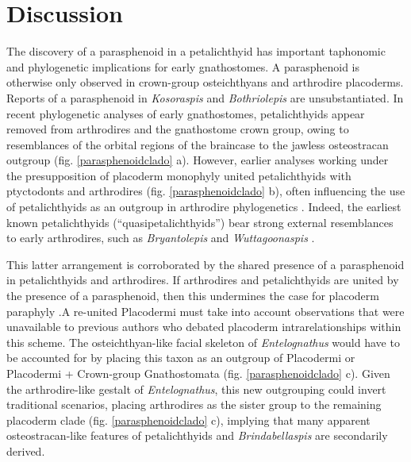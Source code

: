 \documentclass[11pt,letterpaper]{report}
\begin{document}
\section{Discussion}
The discovery of a parasphenoid in a petalichthyid has important taphonomic and phylogenetic implications for early gnathostomes. A parasphenoid is otherwise only observed in crown-group osteichthyans and arthrodire placoderms. Reports of a parasphenoid in \textit{Kosoraspis} \citep{Gross1959} and \textit{Bothriolepis} \citep{Young1986,Dennis-Bryan1995} are unsubstantiated. In recent phylogenetic analyses of early gnathostomes, petalichthyids appear removed from arthrodires and the gnathostome crown group, owing to resemblances of the orbital regions of the braincase to the jawless osteostracan outgroup \citep{Janvier1996a,brazeau2014characters} (fig. \ref{parasphenoidclado} a). However, earlier analyses working under the presupposition of placoderm monophyly united petalichthyids with ptyctodonts and arthrodires \citep{GoujetandYoung1995,goujet2004placoderm} (fig. \ref{parasphenoidclado} b), often influencing the use of petalichthyids as an outgroup in arthrodire phylogenetics \citep{dupret2004phylogenetic}. Indeed, the earliest known petalichthyids (“quasipetalichthyids”) \citep{Zhu1991,pan2015new} bear strong external resemblances to early arthrodires, such as \textit{Bryantolepis} \citep{Elliott2010} and \textit{Wuttagoonaspis} \citep{Ritchie}. 

This latter arrangement is corroborated by the shared presence of a parasphenoid in petalichthyids and arthrodires. If arthrodires and petalichthyids are united by the presence of a parasphenoid, then this undermines the case for placoderm paraphyly \citep{brazeau2014characters}.A re-united Placodermi must take into account observations that were unavailable to previous authors who debated placoderm intrarelationships within this scheme. The osteichthyan-like facial skeleton of \textit{Entelognathus} \citep{zhu2013silurian} would have to be accounted for by placing this taxon as an outgroup of Placodermi or Placodermi + Crown-group Gnathostomata (fig. \ref{parasphenoidclado} c). Given the arthrodire-like gestalt of \textit{Entelognathus}, this new outgrouping could invert traditional scenarios, placing arthrodires as the sister group to the remaining placoderm clade (fig. \ref{parasphenoidclado} c), implying that many apparent osteostracan-like features of petalichthyids and \textit{Brindabellaspis} are secondarily derived.
\end{document}
